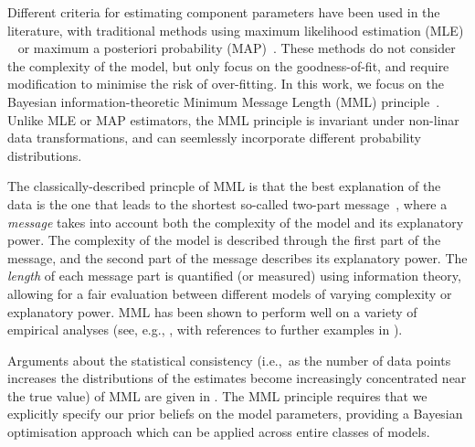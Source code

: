 \documentclass{elsarticle}
\begin{document}
Different criteria for estimating component parameters have been used in the 
literature, with traditional methods using maximum likelihood estimation (MLE)
~\cite{akaike1971determination} or maximum a posteriori probability (MAP)~\cite{shimony1994finding}.
These methods do not consider the complexity of the model, but only focus on
the goodness-of-fit, and require modification to minimise the risk of
over-fitting. In this work, we focus on the Bayesian information-theoretic 
Minimum Message Length (MML) principle~\cite{WallaceBoulton1968, WallaceFreeman1987, WallaceDowe1999a, Wallace05}.
Unlike MLE or MAP estimators, the MML principle is invariant under non-linar
data transformations, and can seemlessly incorporate different probability
distributions.



%
%
The classically-described princple of MML is that the best explanation of the
data is the one that leads to the shortest so-called two-part message~\cite{Wallace05}, 
where a \textit{message} takes into account both the complexity of the model 
and its explanatory power. The complexity of the model is described through
the first part of the message, and the second part of the message describes
its explanatory power. The \emph{length} of each message part is quantified
(or measured) using information theory, allowing for a fair evaluation between
different models of varying complexity or explanatory power. MML has been 
shown to perform well on a variety of empirical analyses (see, e.g., 
\cite{viswanathan1999finding,fitzgibbon2004minimum}, with references to 
further examples in \cite{Wallace05,dowe2007bayes,Dowe2008a,Dowe2011a}).


Arguments about the statistical consistency (i.e.,~as the number of data 
points increases the distributions of the estimates become increasingly 
concentrated near the true value) of MML are given in \cite{DoweWallace1997a,Dowe2011a}.
The MML principle requires that we explicitly specify our prior beliefs on the
model parameters, providing a Bayesian optimisation approach which can be
applied across entire classes of models.
\end{document}
